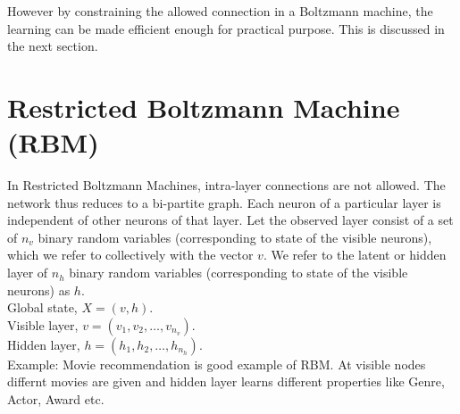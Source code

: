 \documentclass[letterpaper,10pt,english]{article}
\begin{document}
\begin{enumerate}
	However by constraining the allowed connection in a Boltzmann machine, the learning can be made efficient enough for practical purpose. This is discussed in the next section.
\end{enumerate}

\section{Restricted Boltzmann Machine (RBM)}
In Restricted Boltzmann Machines, intra-layer connections are not allowed. The network thus reduces to a bi-partite graph. Each neuron of a particular layer is independent of other neurons of that layer.
Let the observed layer consist of a set of $n_v$ binary random variables (corresponding to state of the visible neurons), which we refer to collectively with the vector \textbf{$v$}. We refer to the latent or hidden layer of $n_h$ binary random variables (corresponding to state of the visible neurons) as \textbf{$h$}.\\
Global state, 	$X = (v, h)$.\\
Visible layer,	$v = (v_{1}, v_{2}, \ldots, v_{n_v})$.\\
Hidden layer,	$h = (h_{1}, h_{2}, \ldots, h_{n_h})$.\\
Example: Movie recommendation is good example of RBM. At visible nodes differnt movies are given and hidden layer learns different properties like Genre, Actor, Award etc.
\end{document}
